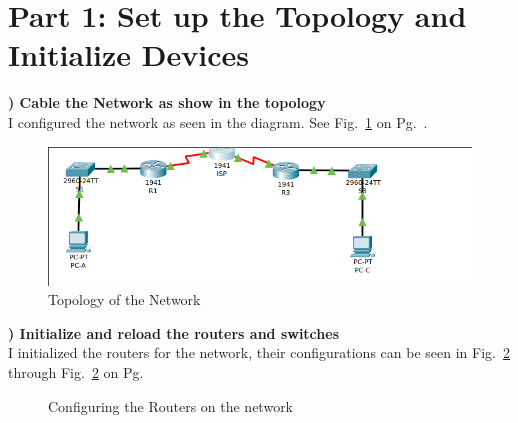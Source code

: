 \documentclass{report}
\title{\classinfo}
\author{\semester}
\date{\today}
\newcommand{\mysection}[1]{\section*{#1}}
\newcommand{\mysubsection}[2]{\textbf{\romannumeral #1) #2}}
\begin{document}
\maketitle

\mysection{\textbf{Part 1: Set up the Topology and Initialize Devices}}

\mysubsection{1}{Cable the Network as show in the topology}\\
I configured the network as seen in the diagram. See
Fig.~\ref{P1Top18} on Pg.~\pageref{P1Top18}.


\begin{figure}[!hbt]\centering
\includegraphics[width=.45\linewidth]{Figures/Topology.png}\par
\caption{Topology of the Network}\label{P1Top18}
\end{figure}


\noindent\mysubsection{2}{Initialize and reload the routers and switches}\\
I initialized the routers for the network, their configurations
can be seen in Fig.~\ref{P1Conf18R} through
Fig.~\ref{P1Conf18R} on Pg.~\pageref{P1Conf18R}


\begin{figure}[!hbt]\centering
{}\hfill
{}\par
{}\par
\caption{Configuring the Routers on the network}\label{P1Conf18R}
\end{figure}
\end{document}
